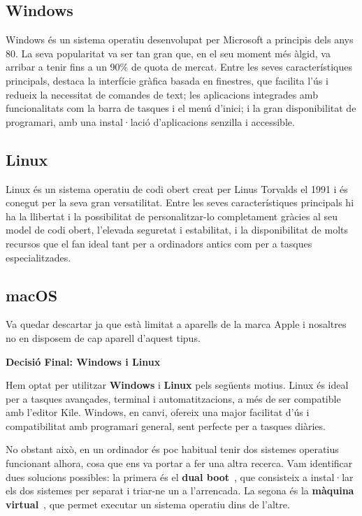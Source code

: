 \subsection{Windows}
Windows és un sistema operatiu desenvolupat per Microsoft a principis dels anys 80. La seva popularitat va ser tan gran que, en el seu moment més àlgid, va arribar a tenir fins a un 90\% de quota de mercat. Entre les seves característiques principals, destaca la interfície gràfica basada en finestres, que facilita l’ús i redueix la necessitat de comandes de text; les aplicacions integrades amb funcionalitats com la barra de tasques i el menú d’inici; i la gran disponibilitat de programari, amb una instal·lació d’aplicacions senzilla i accessible.

\subsection{Linux}
Linux és un sistema operatiu de codi obert creat per Linus Torvalds el 1991 i és conegut per la seva gran versatilitat. Entre les seves característiques principals hi ha la llibertat i la possibilitat de personalitzar-lo completament gràcies al seu model de codi obert, l’elevada seguretat i estabilitat, i la disponibilitat de molts recursos que el fan ideal tant per a ordinadors antics com per a tasques especialitzades.

\subsection{macOS}
\label{subsec:Mac OS}
Va quedar descartar ja que està limitat a aparells de la marca Apple i nosaltres no en disposem de cap aparell d'aquest tipus.

\textbf{Decisió Final: Windows i Linux}

Hem optat per utilitzar \textbf{Windows} i \textbf{Linux} pels següents motius. Linux és ideal per a tasques avançades, terminal i automatitzacions, a més de ser compatible amb l’editor Kile. Windows, en canvi, ofereix una major facilitat d’ús i compatibilitat amb programari general, sent perfecte per a tasques diàries.

No obstant això, en un ordinador és poc habitual tenir dos sistemes operatius funcionant alhora, cosa que ens va portar a fer una altra recerca. Vam identificar dues solucions possibles: la primera és el \textbf{dual boot}~\cite{DualBoot}, que consisteix a instal·lar els dos sistemes per separat i triar-ne un a l’arrencada. La segona és la \textbf{màquina virtual}~\cite{MàquinaVirtual}, que permet executar un sistema operatiu dins de l’altre.

